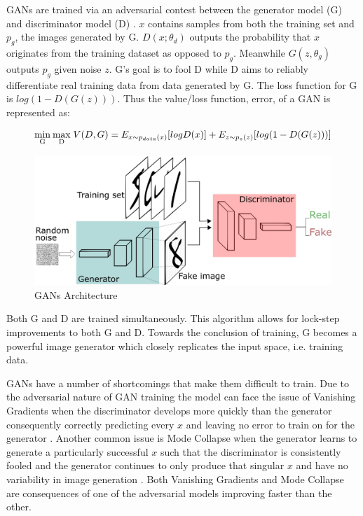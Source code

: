 \documentclass[%
 reprint,
 amsmath,amssymb,
 aps,
]{revtex4-2}
\begin{document}
GANs are trained via an adversarial contest between the generator model (G) and discriminator model (D) \cite{goodfellow2014generative}. $x$ contains samples from both the training set and $p_g$, the images generated by G. $D(x;\theta_d)$ outputs the probability that $x$ originates from the training dataset as opposed to $p_g$. Meanwhile $G(z, \theta_g)$ outputs $p_g$ given noise $z$. G's goal is to fool D while D aims to reliably differentiate real training data from data generated by G. The loss function for G is $log(1 - D(G(z)))$. Thus the value/loss function, error, of a GAN is represented as:
\begin{widetext}
\begin{equation}
\mathrm{\underset{G}{min} \:\underset{D}{max} } \;V (D, G) = E_{x\sim p_{data}(x)} [log D(x)] \\
+ E_{z\sim p_{z}(z)} [log(1 - D(G(z)))]
\end{equation}
\end{widetext}

\begin{figure}[h]
    \includegraphics[width=0.9\columnwidth]{GANs.png}
    \caption{\label{fig:GAN} GANs Architecture \cite{pathmind}}
\end{figure}



Both G and D are trained simultaneously. This algorithm allows for lock-step improvements to both G and D. Towards the conclusion of training, G becomes a powerful image generator which closely replicates the input space, i.e. training data.


GANs have a number of shortcomings that make them difficult to train. Due to the adversarial nature of GAN training the model can face the issue of Vanishing Gradients when the discriminator develops more quickly than the generator consequently correctly predicting every $x$ and leaving no error to train on for the generator \cite{google}. Another common issue is Mode Collapse when the generator learns to generate a particularly successful $x$ such that the discriminator is consistently fooled and the generator continues to only produce that singular $x$ and have no variability in image generation \cite{google}. Both Vanishing Gradients and Mode Collapse are consequences of one of the adversarial models improving faster than the other.
\end{document}
